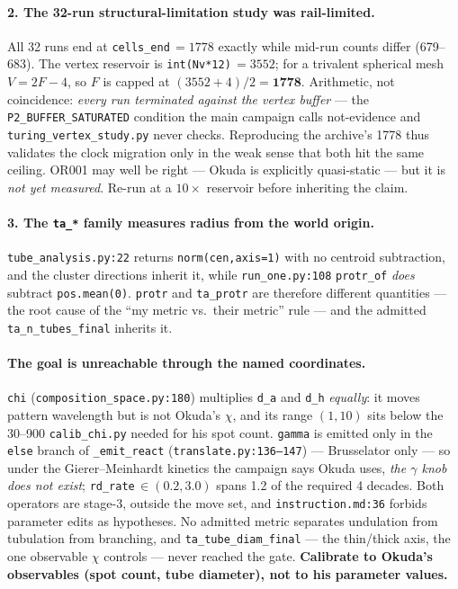 \documentclass[11pt]{article}
\newcommand{\code}[1]{\texttt{#1}}
\begin{document}
{\paragraph{2. The 32-run structural-limitation study was rail-limited.} All 32 runs end at
\code{cells\_end}$\,=1778$ exactly while mid-run counts differ (679--683). The vertex reservoir is
\code{int(Nv*12)}$\,=3552$; for a trivalent spherical mesh $V=2F-4$, so $F$ is capped at
$(3552{+}4)/2=\mathbf{1778}$. Arithmetic, not coincidence: \emph{every run terminated against the
vertex buffer} --- the \code{P2\_BUFFER\_SATURATED} condition the main campaign calls not-evidence
and \code{turing\_vertex\_study.py} never checks. Reproducing the archive's 1778 thus validates the
clock migration only in the weak sense that both hit the same ceiling. OR001 may well be right ---
Okuda is explicitly quasi-static --- but it is \emph{not yet measured}. Re-run at a $10\times$
reservoir before inheriting the claim.

\paragraph{3. The \code{ta\_*} family measures radius from the world origin.}
\code{tube\_analysis.py:22} returns \code{norm(cen,axis=1)} with no centroid subtraction, and the
cluster directions inherit it, while \code{run\_one.py:108} \code{protr\_of} \emph{does} subtract
\code{pos.mean(0)}. \code{protr} and \code{ta\_protr} are therefore different quantities --- the
root cause of the ``my metric vs.\ their metric'' rule --- and the admitted
\code{ta\_n\_tubes\_final} inherits it.

\paragraph{The goal is unreachable through the named coordinates.} \code{chi}
(\code{composition\_space.py:180}) multiplies \code{d\_a} and \code{d\_h} \emph{equally}: it moves
pattern wavelength but is not Okuda's $\chi$, and its range $(1,10)$ sits below the 30--900
\code{calib\_chi.py} needed for his spot count. \code{gamma} is emitted only in the \code{else}
branch of \code{\_emit\_react} (\code{translate.py:136--147}) --- Brusselator only --- so under the
Gierer--Meinhardt kinetics the campaign says Okuda uses, \emph{the $\gamma$ knob does not exist};
\code{rd\_rate}$\,\in(0.2,3.0)$ spans 1.2 of the required 4 decades. Both operators are stage-3,
outside the move set, and \code{instruction.md:36} forbids parameter edits as hypotheses. No
admitted metric separates undulation from tubulation from branching, and
\code{ta\_tube\_diam\_final} --- the thin/thick axis, the one observable $\chi$ controls --- never
reached the gate. \textbf{Calibrate to Okuda's observables (spot count, tube diameter), not to his
parameter values.}

}
\end{document}
